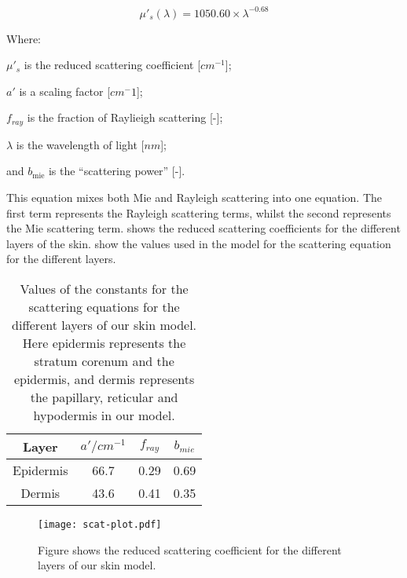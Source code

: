 \begin{equation}
\mu'_s(\lambda)=1050.60\times\lambda^{-0.68}
\label{eqn:hyposcat}
\end{equation}


\noindent Where:

	$\mu'_s$ is the reduced scattering coefficient [$cm^{-1}$];

	$a'$ is a scaling factor [$cm^-1$];

	$f_{ray}$ is the fraction of Raylieigh scattering [-];

	$\lambda$ is the wavelength of light [$nm$];

	and $b_{\text{mie}}$ is the ``scattering power'' [-].

\medskip

This equation mixes both Mie and Rayleigh scattering into one equation.
The first term represents the Rayleigh scattering terms, whilst the second represents the Mie scattering term.
 shows the reduced scattering coefficients for the different layers of the skin.
 show the values used in the model for the scattering equation for the different layers.

\begin{table}[!htpb]
  \centering

  \begin{tabular}{|c|c|c|c|}
  \hline

  Layer & $a'/cm^{-1}$ & $f_{ray}$ & $b_{mie}$ \\
  \hline
   Epidermis         & 66.7 & 0.29 & 0.69 \\
   Dermis  & 43.6 & 0.41 & 0.35 \\

  \hline
  \end{tabular}
  \caption{Values of the constants for the scattering equations for the different layers of our skin model. Here epidermis represents the stratum corenum and the epidermis, and dermis represents the papillary, reticular and hypodermis in our model.}
  \label{tab:valscat}

\end{table}

\begin{figure}[!htpb]
	\centering
	\texttt{[image: scat-plot.pdf]}
	\caption{Figure shows the reduced scattering coefficient for the different layers of our skin model.}
	\label{fig:scatplot}
\end{figure}

\FloatBarrier

